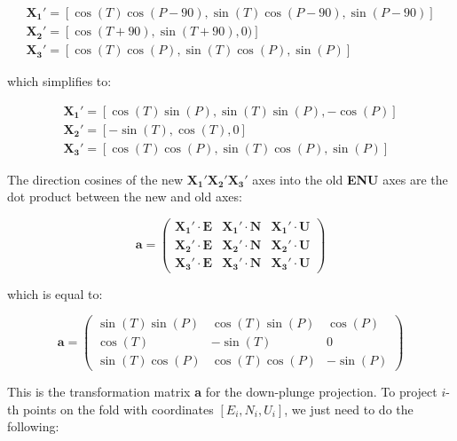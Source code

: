 \documentclass[a4paper , 12pt]{book}
\begin{document}
\begin{gather*}
    \mathbf{X_1\text{$'$}} = [\cos(T)\cos(P-90),\sin(T)\cos(P-90),\sin(P-90)] \\
    \mathbf{X_2\text{$'$}} = [\cos(T+90),\sin(T+90),0)] \\
    \mathbf{X_3\text{$'$}} = [\cos(T)\cos(P),\sin(T)\cos(P),\sin(P)]
\end{gather*}

which simplifies to:

\begin{equation}
    \begin{gathered}
        \mathbf{X_1\text{$'$}} = [\cos(T)\sin(P),\sin(T)\sin(P),-\cos(P)]  \\
        \mathbf{X_2\text{$'$}} = [-\sin(T),\cos(T),0] \\
        \mathbf{X_3\text{$'$}} = [\cos(T)\cos(P),\sin(T)\cos(P),\sin(P)]
    \end{gathered}
\end{equation}

The direction cosines of the new $\mathbf{X_1\text{$'$}}\mathbf{X_2\text{$'$}}\mathbf{X_3\text{$'$}}$ axes into the old \textbf{ENU} axes are the dot product between the new and old axes:

\begin{equation*}
    \textbf{a}=
    \begin{pmatrix}
    \mathbf{X_1\text{$'$}}\cdot\mathbf{E} & \mathbf{X_1\text{$'$}}\cdot\mathbf{N} & \mathbf{X_1\text{$'$}}\cdot\mathbf{U} \\
    \mathbf{X_2\text{$'$}}\cdot\mathbf{E} & \mathbf{X_2\text{$'$}}\cdot\mathbf{N} & \mathbf{X_2\text{$'$}}\cdot\mathbf{U} \\
    \mathbf{X_3\text{$'$}}\cdot\mathbf{E} & \mathbf{X_3\text{$'$}}\cdot\mathbf{N} & \mathbf{X_3\text{$'$}}\cdot\mathbf{U}
\end{pmatrix}
\end{equation*}

which is equal to:

\begin{equation}
    \textbf{a}=
    \begin{pmatrix}
    \sin(T)\sin(P) & \cos(T)\sin(P) & \cos(P) \\
    \cos(T) & -\sin(T) & 0 \\
    \sin(T)\cos(P) & \cos(T)\cos(P) & -\sin(P)
\end{pmatrix}
\end{equation}

This is the transformation matrix \textbf{a} for the down-plunge projection. To project $i$-th points on the fold with coordinates $[E_i,N_i,U_i]$, we just need to do the following:
\end{document}
